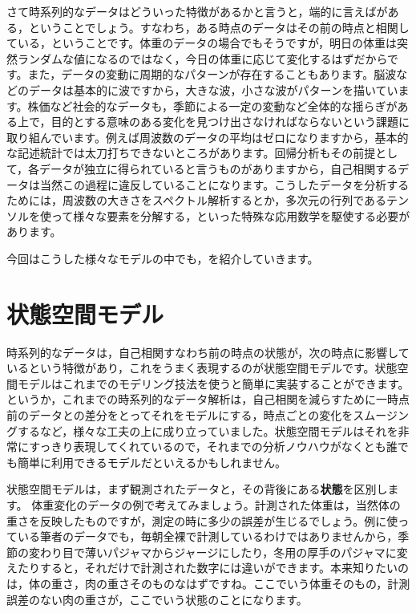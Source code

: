\documentclass{ltjsbook}
\begin{document}
さて時系列的なデータはどういった特徴があるかと言うと，端的に言えばがある，ということでしょう。すなわち，ある時点のデータはその前の時点と相関している，ということです。体重のデータの場合でもそうですが，明日の体重は突然ランダムな値になるのではなく，今日の体重に応じて変化するはずだからです。また，データの変動に周期的なパターンが存在することもあります。脳波などのデータは基本的に波ですから，大きな波，小さな波がパターンを描いています。株価など社会的なデータも，季節による一定の変動など全体的な揺らぎがある上で，目的とする意味のある変化を見つけ出さなければならないという課題に取り組んでいます。例えば周波数のデータの平均はゼロになりますから，基本的な記述統計では太刀打ちできないところがあります。回帰分析もその前提として，各データが独立に得られていると言うものがありますから，自己相関するデータは当然この過程に違反していることになります。こうしたデータを分析するためには，周波数の大きさをスペクトル解析するとか，多次元の行列であるテンソルを使って様々な要素を分解する，といった特殊な応用数学を駆使する必要があります。

今回はこうした様々なモデルの中でも，を紹介していきます。
\section{状態空間モデル}
時系列的なデータは，自己相関すなわち前の時点の状態が，次の時点に影響しているという特徴があり，これをうまく表現するのが状態空間モデルです。状態空間モデルはこれまでのモデリング技法を使うと簡単に実装することができます。というか，これまでの時系列的なデータ解析は，自己相関を減らすために一時点前のデータとの差分をとってそれをモデルにする，時点ごとの変化をスムージングするなど，様々な工夫の上に成り立っていました。状態空間モデルはそれを非常にすっきり表現してくれているので，それまでの分析ノウハウがなくとも誰でも簡単に利用できるモデルだといえるかもしれません。

状態空間モデルは，まず観測されたデータと，その背後にある\textbf{状態}を区別します。
体重変化のデータの例で考えてみましょう。計測された体重は，当然体の重さを反映したものですが，測定の時に多少の誤差が生じるでしょう。例に使っている筆者のデータでも，毎朝全裸で計測しているわけではありませんから，季節の変わり目で薄いパジャマからジャージにしたり，冬用の厚手のパジャマに変えたりすると，それだけで計測された数字には違いができます。本来知りたいのは，体の重さ，肉の重さそのものなはずですね。ここでいう体重そのもの，計測誤差のない肉の重さが，ここでいう状態のことになります。
\end{document}
